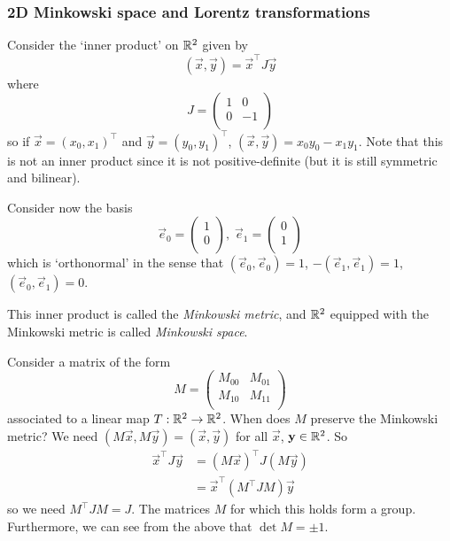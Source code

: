 \documentclass{../../template/note}
\begin{document}
    \subsubsection{2D Minkowski space and Lorentz transformations}

    Consider the `inner product' on \(\mathbb R^2\) given by
    \[
        (\vec x, \vec y) = \vec x^\intercal J \vec y
    \]
    where
    \[
        J = \begin{pmatrix}
         1 & 0 \\
         0 & -1 \\
        \end{pmatrix}
    \]
    so if \(\vec x = (x_0, x_1)^\intercal\) and \(\vec y = (y_0, y_1)^\intercal\), \((\vec x, \vec y) = x_0y_0 - x_1y_1\). Note that this is not an inner product since it is not positive-definite (but it is still symmetric and bilinear).

    Consider now the basis
    \[
        \vec e_0 = \begin{pmatrix}
         1 \\
         0 \\
        \end{pmatrix}, \; \vec e_1 = \begin{pmatrix}
         0 \\
         1 \\
        \end{pmatrix}
    \]
    which is `orthonormal' in the sense that \((\vec e_0, \vec e_0) = 1\), \(-(\vec e_1, \vec e_1) = 1\), \((\vec e_0, \vec e_1) = 0\).

    \begin{definition}
        This inner product is called the \emph{Minkowski metric}, and \(\mathbb R^2\) equipped with the Minkowski metric is called \emph{Minkowski space}.
    \end{definition}
    Consider a matrix of the form
    \[
        M = \begin{pmatrix}
         M_{00} & M_{01} \\
         M_{10} & M_{11} \\
        \end{pmatrix}
    \]
    associated to a linear map \(T: \mathbb R^2 \to \mathbb R^2\). When does \(M\) preserve the Minkowski metric? We need \((M \vec x, M \vec y) = (\vec x, \vec y)\) for all \(\vec x\), \(\vec y \in \RR^2\). So
    \begin{align*}
        \vec x^\intercal J \vec y &= (M \vec x)^\intercal J (M \vec y) \\
        &= \vec x^\intercal (M^\intercal J M)\vec y 
    \end{align*}
    so we need \(M^\intercal J M = J\). The matrices \(M\) for which this holds form a group. Furthermore, we can see from the above that \(\det M = \pm 1\).
    
\end{document}
